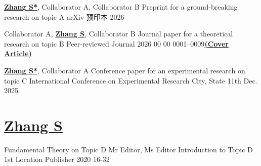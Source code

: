 \documentclass[a4paper,11pt]{article}
\newcommand{\MeAsAuthor}{\textbf{\underline{Zhang S}}}
\newcommand{\MeAsCorrespondingAuthor}{\textbf{\underline{Zhang S*}}}
\newcommand{\PaperComment}[1]{\textbf{\underline{(#1)}}}
\begin{document}

\begin{paperlist}[ascending=false]
	\preprint
		{\MeAsCorrespondingAuthor, Collaborator A, Collaborator B}
		{Preprint for a ground-breaking research on topic A}
		{arXiv}
		{预印本}
		{2026}{}{}

	\journal
		{Collaborator A, \MeAsAuthor, Collaborator B}
		{Journal paper for a theoretical research on topic B}
		{Peer-reviewed Journal}
		{2026}
		{00}
		{00}
		{0001--0009}{}{\PaperComment{Cover Article}}

	\conference
		{\MeAsCorrespondingAuthor, Collaborator A}
		{Conference paper for an experimental research on topic C}
		{International Conference on Experimental Research}
		{City, State}
		{11th Dec. 2025}{}{}

	\chapter
		{\MeAsAuthor}
		{Fundamental Theory on Topic D}
		{Mr Editor, Ms Editor}
		{Introduction to Topic D}
		{1st}
		{Location}
		{Publisher}
		{2020}
		{16-32}{}{}

\end{paperlist}

\end{document}
